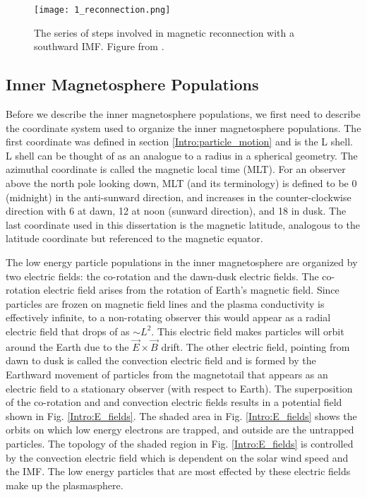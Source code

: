 \begin{figure}
\texttt{[image: 1\_reconnection.png]}
\caption{The series of steps involved in magnetic reconnection with a southward IMF. Figure from \citet{Baumjohann1997}.}
\label{Intro:reconnection}
\end{figure}

\subsection{Inner Magnetosphere Populations}\label{Intro:inner_mag}
Before we describe the inner magnetosphere populations, we first need to describe the coordinate system used to organize the inner magnetosphere populations. The first coordinate was defined in section \ref{Intro:particle_motion} and is the L shell. L shell can be thought of as an analogue to a radius in a spherical geometry. The azimuthal coordinate is called the magnetic local time (MLT). For an observer above the north pole looking down, MLT (and its terminology) is defined to be 0 (midnight) in the anti-sunward direction, and increases in the counter-clockwise direction with 6 at dawn, 12 at noon (sunward direction), and 18 in dusk. The last coordinate used in this dissertation is the magnetic latitude, analogous to the latitude coordinate but referenced to the magnetic equator. 

The low energy particle populations in the inner magnetosphere are organized by two electric fields: the co-rotation and the dawn-dusk electric fields. The co-rotation electric field arises from the rotation of Earth's magnetic field. Since particles are frozen on magnetic field lines and the plasma conductivity is effectively infinite, to a non-rotating observer this would appear as a radial electric field that drops of as $\sim L^2$. This electric field makes particles will orbit around the Earth due to the $\vec{E} \times \vec{B}$ drift. The other electric field, pointing from dawn to dusk is called the convection electric field and is formed by the Earthward movement of particles from the magnetotail that appears as an electric field to a stationary observer (with respect to Earth). The superposition of the co-rotation and and convection electric fields results in a potential field shown in Fig. \ref{Intro:E_fields}. The shaded area in Fig. \ref{Intro:E_fields} shows the orbits on which low energy electrons are trapped, and outside are the untrapped particles. The topology of the shaded region in Fig. \ref{Intro:E_fields} is controlled by the convection electric field which is dependent on the solar wind speed and the IMF. The low energy particles that are most effected by these electric fields make up the plasmasphere.

